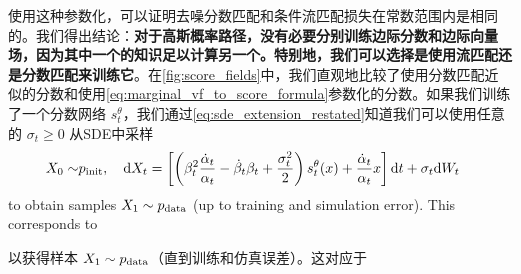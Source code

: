 使用这种参数化，可以证明去噪分数匹配和条件流匹配损失在常数范围内是相同的。我们得出结论：\textbf{对于高斯概率路径，没有必要分别训练边际分数和边际向量场，因为其中一个的知识足以计算另一个。特别地，我们可以选择是使用流匹配还是分数匹配来训练它}。在\cref{fig:score_fields}中，我们直观地比较了使用分数匹配近似的分数和使用\cref{eq:marginal_vf_to_score_formula}参数化的分数。如果我们训练了一个分数网络 $s_t^\theta$，我们通过\cref{eq:sde_extension_restated}知道我们可以使用任意的 $\sigma_t\geq 0$ 从SDE中采样
\begin{align}
    X_0\sim&p_{\rm{init}},\quad \mathrm{d} X_t =\left[\left(\beta_t^2\frac{\dot{\alpha}_t}{\alpha_t}-\dot{\beta}_t\beta_t+\frac{\sigma_t^2}{2}\right)s_t^\theta(x)+\frac{\dot{\alpha}_t}{\alpha_t}x\right]\mathrm{d} t +\sigma_t\mathrm{d} W_t
\end{align}
to obtain samples $X_1\sim p_{\rm{data}}$ (up to training and simulation error). This corresponds to 

以获得样本 $X_1\sim p_{\rm{data}}$（直到训练和仿真误差）。这对应于



